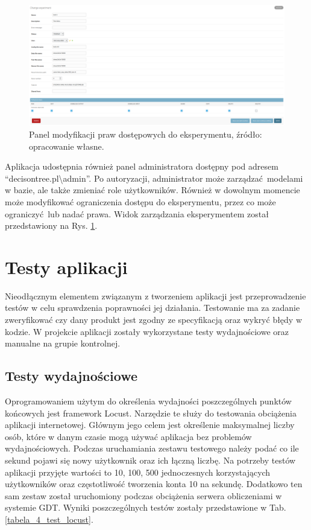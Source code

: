 \begin{figure}[htb]
	\centering
	\includegraphics[width=15cm]{grafika/admin_exp.eps}
	\caption{Panel modyfikacji praw dostępowych do eksperymentu, źródło: opracowanie własne.}
	\label{rys20_admin_exp}
\end{figure}

Aplikacja udostępnia również panel administratora dostępny pod adresem \enquote{decisontree.pl\textbackslash{admin}}. Po autoryzacji, administrator może zarządzać modelami w bazie, ale także zmieniać role użytkowników. Również w dowolnym momencie może modyfikować ograniczenia dostępu do eksperymentu, przez co może ograniczyć lub nadać prawa. Widok zarządzania eksperymentem został przedstawiony na Rys. \ref{rys20_admin_exp}.

\section{Testy aplikacji}
Nieodłącznym elementem związanym z tworzeniem aplikacji jest przeprowadzenie testów w celu sprawdzenia poprawności jej działania. Testowanie ma za zadanie zweryfikować czy dany produkt jest zgodny ze specyfikacją oraz wykryć błędy w kodzie. W projekcie aplikacji zostały wykorzystane testy wydajnościowe oraz manualne na grupie kontrolnej.
 
\subsection{Testy wydajnościowe}
Oprogramowaniem użytym do określenia wydajności poszczególnych punktów końcowych jest framework Locust. Narzędzie te służy do testowania obciążenia aplikacji internetowej. Głównym jego celem jest określenie maksymalnej liczby osób, które w danym czasie mogą używać aplikacja bez problemów wydajnościowych. Podczas uruchamiania zestawu testowego należy podać co ile sekund pojawi się nowy użytkownik oraz ich łączną liczbę. Na potrzeby testów aplikacji przyjęte wartości to 10, 100, 500 jednoczesnych korzystających użytkowników oraz częstotliwość tworzenia konta 10 na sekundę. Dodatkowo ten sam zestaw został uruchomiony podczas obciążenia serwera obliczeniami w systemie GDT. Wyniki poszczególnych testów zostały przedstawione w Tab. \ref{tabela_4_test_locust}. 

